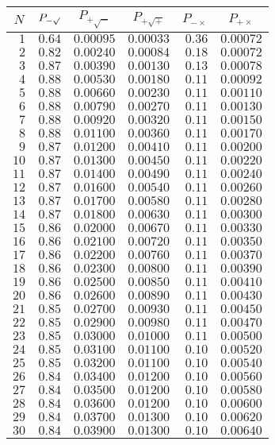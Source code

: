 %
\begin{table}[\hbtp]
 \small
 \begin{center}
 \begin{tabular}{rrrrrr}\hline\hline
\multicolumn{1}{c}{$N$}&\multicolumn{1}{c}{$P_{-\surd}$}&\multicolumn{1}{c}{$P_{+\surd - }$}&\multicolumn{1}{c}{$P_{+\surd +}$}&\multicolumn{1}{c}{$P_{-\times}$}&\multicolumn{1}{c}{$P_{+\times}$}\tabularnewline
\hline
$ 1$&$0.64$&$0.00095$&$0.00033$&$0.36$&$0.00072$\tabularnewline
$ 2$&$0.82$&$0.00240$&$0.00084$&$0.18$&$0.00072$\tabularnewline
$ 3$&$0.87$&$0.00390$&$0.00130$&$0.13$&$0.00078$\tabularnewline
$ 4$&$0.88$&$0.00530$&$0.00180$&$0.11$&$0.00092$\tabularnewline
$ 5$&$0.88$&$0.00660$&$0.00230$&$0.11$&$0.00110$\tabularnewline
$ 6$&$0.88$&$0.00790$&$0.00270$&$0.11$&$0.00130$\tabularnewline
$ 7$&$0.88$&$0.00920$&$0.00320$&$0.11$&$0.00150$\tabularnewline
$ 8$&$0.88$&$0.01100$&$0.00360$&$0.11$&$0.00170$\tabularnewline
$ 9$&$0.87$&$0.01200$&$0.00410$&$0.11$&$0.00200$\tabularnewline
$10$&$0.87$&$0.01300$&$0.00450$&$0.11$&$0.00220$\tabularnewline
$11$&$0.87$&$0.01400$&$0.00490$&$0.11$&$0.00240$\tabularnewline
$12$&$0.87$&$0.01600$&$0.00540$&$0.11$&$0.00260$\tabularnewline
$13$&$0.87$&$0.01700$&$0.00580$&$0.11$&$0.00280$\tabularnewline
$14$&$0.87$&$0.01800$&$0.00630$&$0.11$&$0.00300$\tabularnewline
$15$&$0.86$&$0.02000$&$0.00670$&$0.11$&$0.00330$\tabularnewline
$16$&$0.86$&$0.02100$&$0.00720$&$0.11$&$0.00350$\tabularnewline
$17$&$0.86$&$0.02200$&$0.00760$&$0.11$&$0.00370$\tabularnewline
$18$&$0.86$&$0.02300$&$0.00800$&$0.11$&$0.00390$\tabularnewline
$19$&$0.86$&$0.02500$&$0.00850$&$0.11$&$0.00410$\tabularnewline
$20$&$0.86$&$0.02600$&$0.00890$&$0.11$&$0.00430$\tabularnewline
$21$&$0.85$&$0.02700$&$0.00930$&$0.11$&$0.00450$\tabularnewline
$22$&$0.85$&$0.02900$&$0.00980$&$0.11$&$0.00470$\tabularnewline
$23$&$0.85$&$0.03000$&$0.01000$&$0.11$&$0.00500$\tabularnewline
$24$&$0.85$&$0.03100$&$0.01100$&$0.10$&$0.00520$\tabularnewline
$25$&$0.85$&$0.03200$&$0.01100$&$0.10$&$0.00540$\tabularnewline
$26$&$0.84$&$0.03400$&$0.01200$&$0.10$&$0.00560$\tabularnewline
$27$&$0.84$&$0.03500$&$0.01200$&$0.10$&$0.00580$\tabularnewline
$28$&$0.84$&$0.03600$&$0.01200$&$0.10$&$0.00600$\tabularnewline
$29$&$0.84$&$0.03700$&$0.01300$&$0.10$&$0.00620$\tabularnewline
$30$&$0.84$&$0.03900$&$0.01300$&$0.10$&$0.00640$\tabularnewline

\end{tabular}
\end{center}
\end{table}
